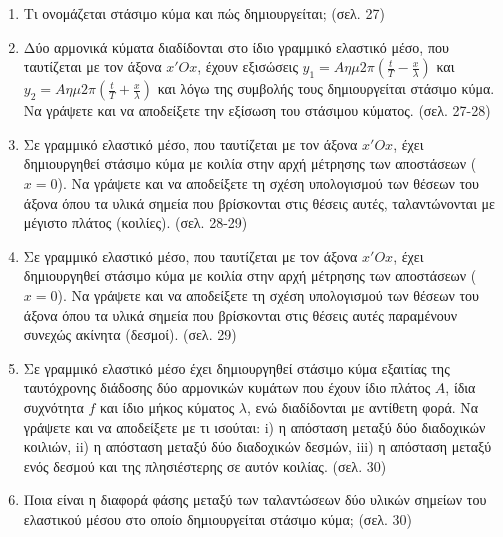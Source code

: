 \documentclass{article}
\begin{document}
\begin{enumerate}
      \item Τι ονομάζεται στάσιμο κύμα και πώς δημιουργείται; (σελ. 27)

      \item Δύο αρμονικά κύματα διαδίδονται στο ίδιο γραμμικό ελαστικό μέσο, που ταυτίζεται με τον άξονα $x'Ox$, έχουν εξισώσεις $y_1 = A\eta\mu 2\pi (\frac{t}{T} - \frac{x}{\lambda})$ και $y_2 = A\eta\mu 2\pi (\frac{t}{T} + \frac{x}{\lambda})$ και λόγω της συμβολής τους δημιουργείται στάσιμο κύμα. Να γράψετε και να αποδείξετε την εξίσωση του στάσιμου κύματος. (σελ. 27-28)

      \item Σε γραμμικό ελαστικό μέσο, που ταυτίζεται με τον άξονα $x'Ox$, έχει δημιουργηθεί στάσιμο κύμα με κοιλία στην αρχή μέτρησης των αποστάσεων ($x = 0$). Να γράψετε και να αποδείξετε τη σχέση υπολογισμού των θέσεων του άξονα όπου τα υλικά σημεία που βρίσκονται στις θέσεις αυτές, ταλαντώνονται με μέγιστο πλάτος (κοιλίες). (σελ. 28-29)

      \item Σε γραμμικό ελαστικό μέσο, που ταυτίζεται με τον άξονα $x'Ox$, έχει δημιουργηθεί στάσιμο κύμα με κοιλία στην αρχή μέτρησης των αποστάσεων ($x = 0$). Να γράψετε και να αποδείξετε τη σχέση υπολογισμού των θέσεων του άξονα όπου τα υλικά σημεία που βρίσκονται στις θέσεις αυτές παραμένουν συνεχώς ακίνητα (δεσμοί). (σελ. 29)

      \item Σε γραμμικό ελαστικό μέσο έχει δημιουργηθεί στάσιμο κύμα εξαιτίας της ταυτόχρονης διάδοσης δύο αρμονικών κυμάτων που έχουν ίδιο πλάτος $A$, ίδια συχνότητα $f$ και ίδιο μήκος κύματος $\lambda$, ενώ διαδίδονται με αντίθετη φορά. Να γράψετε και να αποδείξετε με τι ισούται: i) η απόσταση μεταξύ δύο διαδοχικών κοιλιών, ii) η απόσταση μεταξύ δύο διαδοχικών δεσμών, iii) η απόσταση μεταξύ ενός δεσμού και της πλησιέστερης σε αυτόν κοιλίας. (σελ. 30)

      \item Ποια είναι η διαφορά φάσης μεταξύ των ταλαντώσεων δύο υλικών σημείων του ελαστικού μέσου στο οποίο δημιουργείται στάσιμο κύμα; (σελ. 30)
\end{enumerate}
\end{document}
